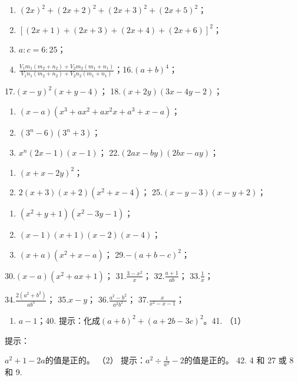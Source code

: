 \begin{enumerate}[start=12]
\item
  \((2x)^{2} + (2x + 2)^{2} + (2x + 3)^{2} + (2x + 5)^{2}\)；
\item
  \(\left[(2x + 1) + (2x + 3) + (2x + 4) + (2x + 6)\right]^2\)；
\item
  \(a:c = 6:25\)；
\item
  \(\frac{V_1m_1(m_2 + n_2) + V_2m_2(m_1 + n_1)}{V_1n_1(m_2 + n_2) + V_2n_2(m_1 + n_1)}\)；16.\((a + b)^4\)；
\end{enumerate}

17.\((x - y)^{2}(x + y - 4)\)； 18.\((x + 2y)(3x - 4y - 2)\)；

\begin{enumerate}[start=19]
\item
  \((x - a)(x^3 + ax^2 + ax^2x + a^3 + x - a)\)；
\item
  \((3^n - 6)(3^n + 3)\)；
\item
  \(x^n (2x - 1)(x - 1)\)； 22.\((2ax - by)(2bx - ay)\)；
\end{enumerate}
\begin{enumerate}[start=23]
\item
  \((x + x - 2y)^2\)；
\item
  \(2(x + 3)(x + 2)(x^2 + x - 4)\)； 25.\((x - y - 3)(x - y + 2)\)；
\end{enumerate}

\begin{enumerate}[start=26]
\item
  \((x^{2} + y + 1)(x^{2} - 3y - 1)\)；
\item
  \((x - 1)(x + 1)(x - 2)(x - 4)\)；
\item
  \((x + a)(x^2 + x - a)\)； 29.\(-(a + b - c)^2\)；
\end{enumerate}

30.\((x - a)(x^2 + ax + 1)\)； 31.\(\frac{3 - x^2}{x}\)；
32.\(\frac{a + 1}{ab}\)； 33.\(\frac{1}{x}\)；

34.\(\frac{2(a^2 + b^2)}{ab^3}\)； 35.\(x - y\)；
36.\(\frac{a^2 - b^2}{a^2b^2}\)； 37.\(\frac{x}{x^2 - x - 1}\)；

\begin{enumerate}[start=38]
\item
  \(a - 1\)；40. 提示：化成\((a + b)^2 + (a + 2b - 3c)^2\)。41. （1）
\end{enumerate}
提示：

\(a^2 + 1 - 2a\)的值是正的。 （2）
提示：\(a^2 \div \frac{1}{a^2} - 2\)的值是正的。 42. 4 和 27 或 8 和 9.

